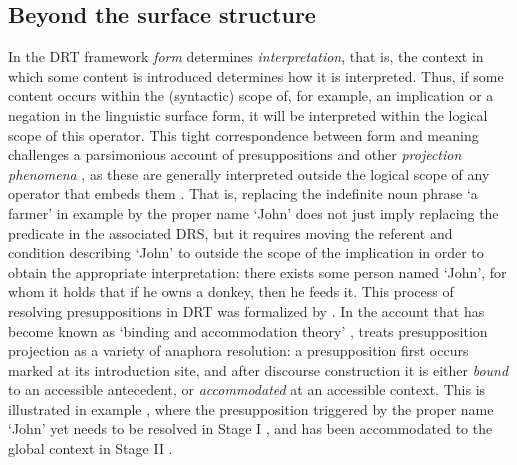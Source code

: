 \subsection{Beyond the surface structure}

In the DRT framework \textit{form} determines \textit{interpretation}, that
is, the context in which some content is introduced determines how it is
interpreted. Thus, if some content occurs within the (syntactic) scope of,
for example, an implication or a negation in the linguistic surface form, it
will be interpreted within the logical scope of this operator. This tight
correspondence between form and meaning challenges a parsimonious account of
presuppositions and other \textit{projection phenomena}
, as these
are generally interpreted outside the logical scope of any operator that
embeds them .  That
is, replacing the indefinite noun phrase `a farmer' in example \Last by the
proper name `John' does not just imply replacing the predicate in the
associated DRS, but it requires moving the referent and condition describing
`John' to outside the scope of the implication in order to obtain the
appropriate interpretation: there exists some person named `John', for whom
it holds that if he owns a donkey, then he feeds it.  This process of
resolving presuppositions in DRT was formalized by
. In the account that has become known
as `binding and accommodation theory'
\cite{geurts1999presuppositions,beaver2002presupposition,bos2003implementing},
 treats presupposition projection as
a variety of anaphora resolution: a presupposition first occurs marked at
its introduction site, and after discourse construction it is either
\textit{bound} to an accessible antecedent, or \textit{accommodated} at an
accessible context. This is illustrated in example \Next, where the
presupposition triggered by the proper name `John' yet needs to be resolved
in Stage I \Next[a], and has been accommodated to the global context in
Stage II \Next[b].

